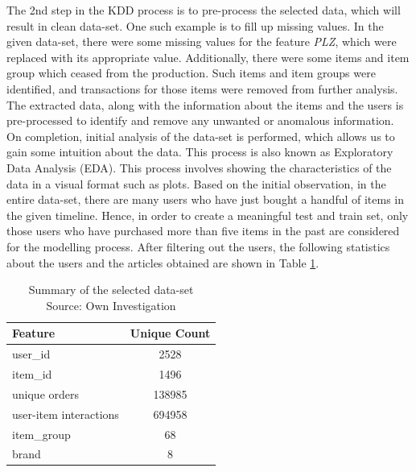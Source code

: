 The 2nd step in the KDD process is to pre-process the selected data, which will result in clean data-set. One such example is to fill up missing values. In the given data-set, there were some missing values for the feature \textit{PLZ}, which were replaced with its appropriate value. Additionally, there were some items and item group which ceased from the production. Such items and item groups were identified, and transactions for those items were removed from further analysis. The extracted data, along with the information about the items and the users is pre-processed to identify and remove any unwanted or anomalous information. On completion, initial analysis of the data-set is performed, which allows us to gain some intuition about the data. This process is also known as Exploratory Data Analysis (EDA). This process involves showing the characteristics of the data in a visual format such as plots. Based on the initial observation, in the entire data-set, there are many users who have just bought a handful of items in the given timeline. Hence, in order to create a meaningful test and train set, only those users who have purchased more than five items in the past are considered for the modelling process. After filtering out the users, the following statistics about the users and the articles obtained are shown in Table \ref{tab:data}.\\ 
\Par

\begin{table}[t]
\centering
\begin{tabular}{|l|c|}
\hline
Feature & Unique Count\\
\hline\hline
user{\_}id & 2528\\
\hline
item{\_}id  &  1496\\
\hline
unique orders & 138985  \\
\hline
user-item interactions  & 694958\\
\hline
item{\_}group & 68 \\ 
\hline
brand & 8\\ 
\hline
\end{tabular}
\caption{Summary of the selected data-set \\
Source: Own Investigation}
\label{tab:data}
\end{table}


